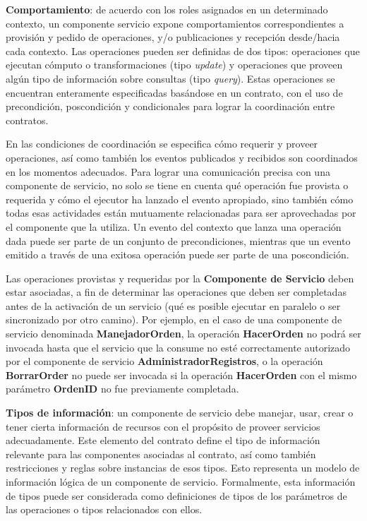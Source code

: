 \begin{itemize}
\textbf{Comportamiento}: de acuerdo con los roles asignados en un determinado contexto, un componente servicio expone comportamientos correspondientes a provisión y pedido de operaciones, y/o publicaciones y recepción desde/hacia cada contexto. Las operaciones pueden ser definidas de dos tipos: operaciones que ejecutan cómputo o transformaciones (tipo \textit{update}) y operaciones que proveen algún tipo de información sobre consultas (tipo \textit{query}). Estas operaciones se encuentran enteramente especificadas basándose en un contrato, con el uso de precondición, poscondición y condicionales para lograr la coordinación entre contratos. 

En las condiciones de coordinación se especifica cómo requerir y proveer operaciones, así como también los eventos publicados y recibidos son coordinados en los momentos adecuados. Para lograr una comunicación precisa con una componente de servicio, no solo se tiene en cuenta qué operación fue provista o requerida y cómo el ejecutor ha lanzado el evento apropiado, sino también cómo todas esas actividades están mutuamente relacionadas para ser aprovechadas por el componente que la utiliza. Un evento del contexto que lanza una operación dada puede ser parte de un conjunto de precondiciones, mientras que un evento emitido a través de una exitosa operación puede ser parte de una poscondición.

%

Las operaciones provistas y requeridas por la \textbf{Componente de Servicio} deben estar asociadas, a fin de determinar las operaciones que deben ser completadas antes de la activación de un servicio (qué es posible ejecutar en paralelo o ser sincronizado por otro camino). 
Por ejemplo, en el caso de una componente de servicio denominada \textbf{ManejadorOrden}, la operación \textbf{HacerOrden} no podrá ser invocada hasta que el servicio que la consume no esté correctamente autorizado por el componente de servicio \textbf{AdministradorRegistros}, o la operación \textbf{BorrarOrder} no puede ser invocada si la operación \textbf{HacerOrden} con el mismo parámetro \textbf{OrdenID} no fue previamente completada.



\textbf{Tipos de información}: un componente de servicio debe manejar, usar, crear o tener cierta información de recursos con el propósito de proveer servicios adecuadamente. Este elemento del contrato define el tipo de información relevante para las componentes asociadas al contrato, así como también restricciones y reglas sobre instancias de esos tipos. Esto representa un modelo de información lógica de un componente de servicio. Formalmente, esta información de tipos puede ser considerada como definiciones de tipos de los parámetros de las operaciones o tipos relacionados con ellos.



\end{itemize}

